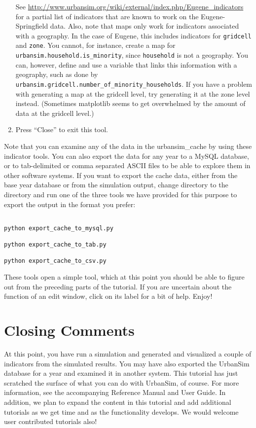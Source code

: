 \documentclass{howto}
\begin{document}
\begin{enumerate}
See \url{http://www.urbansim.org/wiki/external/index.php/Eugene_indicators} for a
partial list of indicators that are known to work on the Eugene-Springfield
data.  Also, note that maps only
work for indicators associated with a geography.  In the case of Eugene, this
includes indicators for \verb|gridcell| and \verb|zone|.
You cannot, for instance, 
create a map for \verb|urbansim.household.is_minority|, since \verb|household|
is not a geography.  You can, however, define and use a variable that links this
information with a geography, such as done by 
\verb|urbansim.gridcell.number_of_minority_households|.  If you have a problem
with generating a map at the gridcell level, try generating it at the zone
level instead.  (Sometimes matplotlib seems to get overwhelmed by the amount of 
data at the gridcell level.)

\item Press ``Close'' to exit this tool.

\end{enumerate}

Note that you can examine any of the data in the urbansim_cache by
using these indicator tools.  You can also export the data for any
year to a MySQL database, or to tab-delimited or comma separated
ASCII files to be able to explore them in other software systems. If
you want to export the cache data, either from the base year
database or from the simulation output, change directory to the
 directory and run one of the three
tools we have provided for this purpose to export the output in the
format you prefer:

\begin{verbatim}

python export_cache_to_mysql.py

python export_cache_to_tab.py

python export_cache_to_csv.py

\end{verbatim}

These tools open a simple tool, which at this point you should be
able to figure out from the preceding parts of the tutorial.  If you
are uncertain about the function of an edit window, click on its
label for a bit of help. Enjoy!

\section*{Closing Comments}

At this point, you have run a simulation and generated and
visualized a couple of indicators from the simulated results. You
may have also exported the UrbanSim database for a year and examined
it in another system. This tutorial has just scratched the
surface of what you can do with UrbanSim, of course. For more information,
see the accompanying Reference Manual and User Guide. In addition,
we plan to expand the content in this tutorial and add additional
tutorials as we get time and as the functionality develops.  We
would welcome user contributed tutorials also!
\end{document}
